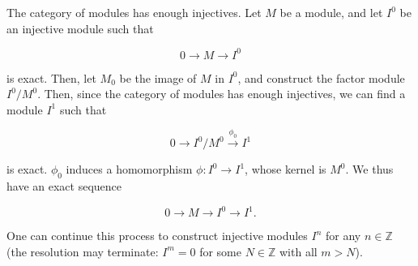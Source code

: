 \documentclass[12pt]{article}
\begin{document}
The category of modules has enough injectives.
Let $M$ be a module, and let $I^0$ be an injective module such that 

\[
0  \longrightarrow M \longrightarrow I^0
\]

is exact.  Then, let $M_0$ be the image of $M$ in $I^0$, and construct the factor module $I^0\slash M^0$.  Then, since the category of modules has enough injectives, we can find a module $I^1$ such that 

\[
0 \longrightarrow I^0 \slash M^0 \stackrel{\phi_0}{\longrightarrow} I^1
\]

is exact.  $\phi_0$ induces a homomorphism $\phi \!:\! I^0 \longrightarrow I^1$, whose kernel is $M^0$.  We thus have an exact sequence

\[
0 \longrightarrow M \longrightarrow I^0 \longrightarrow I^1.
\]

One can continue this process to construct injective modules $I^n$ for any $n\in \mathbb Z$ (the resolution may terminate: $I^m = 0$ for some $N\in \mathbb Z$ with all $m > N$). 
\end{document}

